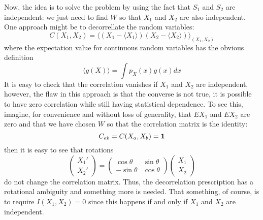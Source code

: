 \documentclass[12pt]{article}
\begin{document}
Now, the idea is to solve the problem by using the fact that $S_1$ and
$S_2$ are independent: we just need to find $W$ so that $X_1$ and
$X_2$ are also independent. One approach might be to decorrellate the
random variables:
\begin{equation}
C(X_1,X_2)=\langle(X_1-\langle X_1\rangle)(X_2-\langle X_2\rangle)\rangle_{(X_1,X_2)}
\end{equation}
where the expectation value for continuous random variables has the obvious definition
\begin{equation}
\langle g(X)\rangle =\int p_X(x)g(x) dx
\end{equation}
It is easy to check that the correlation vanishes if $X_1$ and $X_2$
are independent, however, the flaw in this approach is that the
converse is not true, it is possible to have zero correlation while
still having statistical dependence. To see this, imagine, for
convenience and without loss of generality, that $EX_1$ and $EX_2$ are
zero and that we have chosen $W$ so that the correlation matrix is the
identity:
\begin{equation}
C_{ab}=C(X_a,X_b)={\bf 1}
\end{equation}
then it is easy to see that rotations
\begin{equation}
\left(\begin{array}{c}X_1'\\X_2'\end{array}\right)=\left(\begin{array}{cc}\cos{\theta}&\sin{\theta}\\-\sin{\theta}&\cos{\theta}\end{array}\right)\left(\begin{array}{c}X_1\\X_2\end{array}\right)
\end{equation}
do not change the correlation matrix. Thus, the decorrelation
prescription has a rotational ambiguity and something more is
needed. That something, of course, is to require $I(X_1,X_2)=0$ since
this happens if and only if $X_1$ and $X_2$ are independent.
\end{document}
